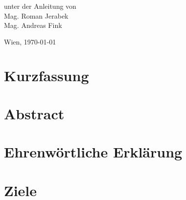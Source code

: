 \documentclass[
    headings=optiontotocandhead,%
    twoside,
    numbers=noenddot,%
    toc=flat, %
    12pt, %
    titlepage, %
    parskip=full, %
    listof=totoc, %
    listof=flat, %
    numbers=noenddot, %
    bibliography=totoc, %
    a4paper,DIV=14,
    BCOR=15mm,
]{scrbook}
\begin{document}
\begin{titlepage}
\begin{center}
\vspace{20mm}
 \normalsize unter der Anleitung von\\
 \vspace{0.5cm}
 Mag. Roman Jerabek\\
 Mag. Andreas Fink
\par\end{center}

\begin{center}
\vspace{5mm}
Wien, \today 
\par\end{center}

\end{titlepage}%

\chapter*{Kurzfassung}


\chapter*{Abstract}


\chapter*{Ehrenwörtliche Erklärung}


\cleardoublepage{}
\setcounter{tocdepth}{5}
\tableofcontents{}
\cleardoublepage{}
\listoftables
\cleardoublepage{}
\listoffigures

\cleardoublepage{}
\mainmatter

\chapter{Ziele}
\end{document}
